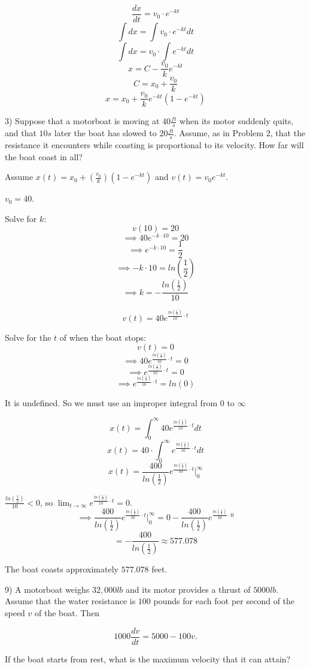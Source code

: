\documentclass{article}
\begin{document}
\[\frac{dx}{dt} = v_0 \cdot e^{-kt}\]
\[\int dx = \int v_0 \cdot e^{-kt} dt\]
\[\int dx = v_0 \cdot \int e^{-kt} dt\]
\[x = C -\frac{v_0}{k} e^{-kt}\]
\[C = x_0 + \frac{v_0}{k}\]
\[x = x_0 + \frac{v_0}{k} e^{-kt}(1 - e^{-kt})\]


3) Suppose that a motorboat is moving at $40 \frac{ft}{s}$
when its motor suddenly quits, and that $10 s$ later the boat
has slowed to $20 \frac{ft}{s}$. Assume, as in Problem 2, that
the resistance it encounters while coasting is proportional
to its velocity. How far will the boat coast in all?


Assume $x(t) = x_0 + (\frac{v_0}{k}) (1 - e^{-kt})$ and
$v(t) = v_0 e^{-kt}$.

$v_0 = 40$.

Solve for $k$:
\[v(10) = 20\]
\[\implies 40 e^{-k \cdot 10} = 20\]
\[\implies e^{-k \cdot 10} = \frac{1}{2}\]
\[\implies -k \cdot 10 = ln(\frac{1}{2})\]
\[\implies k = -\frac{ln(\frac{1}{2})}{10}\]

\[v(t) = 40 e^{\frac{ln(\frac{1}{2})}{10} \cdot t}\]

Solve for the $t$ of when the boat stops:
\[v(t) = 0\]
\[\implies 40 e^{\frac{ln(\frac{1}{2})}{10} \cdot t} = 0\]
\[\implies e^{\frac{ln(\frac{1}{2})}{10} \cdot t} = 0\]
\[\implies e^{\frac{ln(\frac{1}{2})}{10} \cdot t} = ln(0)\]

It is undefined. So we must use an improper integral from 0 to $\infty$


\[x(t) = \int_{0}^{\infty} 40 e^{\frac{ln(\frac{1}{2})}{10} \cdot t} dt\]
\[x(t) = 40 \cdot \int_{0}^{\infty} e^{\frac{ln(\frac{1}{2})}{10} \cdot t} dt\]
\[x(t) = \frac{400}{ln(\frac{1}{2})} e^{\frac{ln(\frac{1}{2})}{10} \cdot t} |_0^{\infty}\]


$\frac{ln(\frac{1}{2})}{10} < 0$,
so $\lim_{t \to \infty} e^{\frac{ln(\frac{1}{2})}{10} \cdot t} = 0$.
\[\implies \frac{400}{ln(\frac{1}{2})} e^{\frac{ln(\frac{1}{2})}{10} \cdot t} |_0^{\infty}
= 0 - \frac{400}{ln(\frac{1}{2})} e^{\frac{ln(\frac{1}{2})}{10} \cdot 0}\]
\[= -\frac{400}{ln(\frac{1}{2})} \approx 577.078\]


The boat coasts approximately $577.078$ feet.



9) A motorboat weighs $32,000 lb$ and its motor provides
a thrust of $5000 lb$. Assume that the water resistance
is $100$ pounds for each foot per second of the speed $v$
of the boat. Then

\[1000 \frac{dv}{dt} = 5000 - 100v.\]

If the boat starts from rest, what is the maximum velocity
that it can attain?
\end{document}
